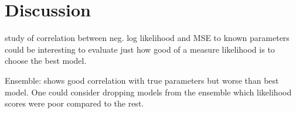 \section{Discussion}

study of correlation between neg. log likelihood and MSE to known parameters could be interesting to evaluate just how good of a measure likelihood is to choose the best model.

Ensemble: shows good correlation with true parameters but worse than best model. One could consider dropping models from the ensemble which likelihood scores were poor compared to the rest. 








